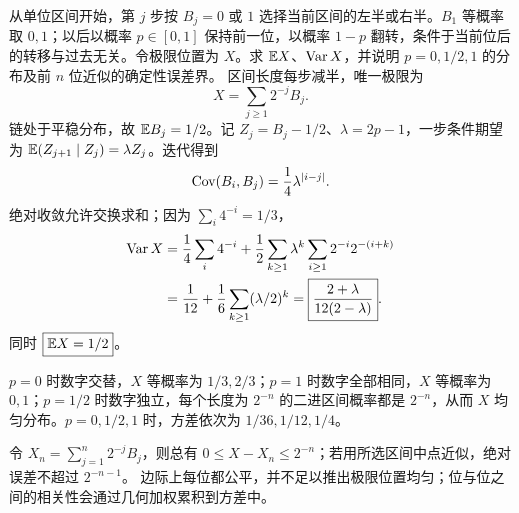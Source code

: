 从单位区间开始，第 $j$ 步按 $B_j=0$ 或 $1$ 选择当前区间的左半或右半。$B_1$ 等概率取 $0,1$；以后以概率 $p\in[0,1]$ 保持前一位，以概率 $1-p$ 翻转，条件于当前位后的转移与过去无关。令极限位置为 $X$。求 $\mathbb{E} X$、$\operatorname{Var} X$，并说明 $p=0,1/2,1$ 的分布及前 $n$ 位近似的确定性误差界。
\solution 区间长度每步减半，唯一极限为
\[
X=\sum_{j\ge1}2^{-j}B_j.
\]
链处于平稳分布，故 $\mathbb{E} B_j=1/2$。记 $Z_j=B_j-1/2$、$\lambda=2p-1$，一步条件期望为 $\mathbb{E}(Z_{j+1}\mid Z_j)=\lambda Z_j$。迭代得到
\[
\operatorname{Cov}(B_i,B_j)=\frac14\lambda^{|i-j|}.
\]
绝对收敛允许交换求和；因为 $\sum_i4^{-i}=1/3$，
\[
\begin{aligned}
\operatorname{Var} X
&=\frac14\sum_i4^{-i}
+\frac12\sum_{k\ge1}\lambda^k\sum_{i\ge1}2^{-i}2^{-(i+k)}\\
&=\frac1{12}+\frac16\sum_{k\ge1}(\lambda/2)^k
=\boxed{\frac{2+\lambda}{12(2-\lambda)}}.
\end{aligned}
\]
同时 $\boxed{\mathbb{E} X=1/2}$。

$p=0$ 时数字交替，$X$ 等概率为 $1/3,2/3$；$p=1$ 时数字全部相同，$X$ 等概率为 $0,1$；$p=1/2$ 时数字独立，每个长度为 $2^{-n}$ 的二进区间概率都是 $2^{-n}$，从而 $X$ 均匀分布。$p=0,1/2,1$ 时，方差依次为 $1/36,1/12,1/4$。

令 $X_n=\sum_{j=1}^n2^{-j}B_j$，则总有 $0\le X-X_n\le2^{-n}$；若用所选区间中点近似，绝对误差不超过 $2^{-n-1}$。
\insight 边际上每位都公平，并不足以推出极限位置均匀；位与位之间的相关性会通过几何加权累积到方差中。
